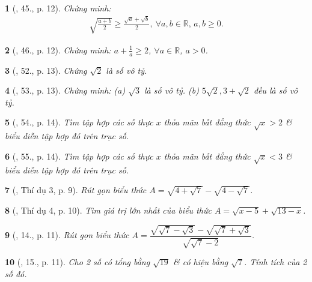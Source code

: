 \documentclass{article}
\newtheorem{baitoan}{}%
\begin{document}
\begin{baitoan}[\cite{SBT_Toan_9_tap_1}, 45., p. 12]
	Chứng minh:
	\begin{align*}
		\sqrt{\frac{a + b}{2}}\ge\frac{\sqrt{a} + \sqrt{b}}{2},\ \forall a,b\in\mathbb{R},\,a,b\ge0.
	\end{align*}
\end{baitoan}

\begin{baitoan}[\cite{SBT_Toan_9_tap_1}, 46., p. 12]
	Chứng minh: $a + \frac{1}{a}\ge2$, $\forall a\in\mathbb{R}$, $a > 0$.
\end{baitoan}

\begin{baitoan}[\cite{SBT_Toan_9_tap_1}, 52., p. 13]
	Chứng $\sqrt{2}$ là số vô tỷ.
\end{baitoan}

\begin{baitoan}[\cite{SBT_Toan_9_tap_1}, 53., p. 13]
	Chứng minh: (a) $\sqrt{3}$ là số vô tỷ. (b) $5\sqrt{2},3 + \sqrt{2}$ đều là số vô tỷ.
\end{baitoan}

\begin{baitoan}[\cite{SBT_Toan_9_tap_1}, 54., p. 14]
	Tìm tập hợp các số thực $x$ thỏa mãn bất đẳng thức $\sqrt{x} > 2$ \& biểu diễn tập hợp đó trên trục số.
\end{baitoan}

\begin{baitoan}[\cite{SBT_Toan_9_tap_1}, 55., p. 14]
	Tìm tập hợp các số thực $x$ thỏa mãn bất đẳng thức $\sqrt{x} < 3$ \& biểu diễn tập hợp đó trên trục số.
\end{baitoan}

\begin{baitoan}[\cite{Tuyen_Toan_9_old}, Thí dụ 3, p. 9]
	Rút gọn biểu thức $A = \sqrt{4 + \sqrt{7}} - \sqrt{4 - \sqrt{7}}$.
\end{baitoan}

\begin{baitoan}[\cite{Tuyen_Toan_9_old}, Thí dụ 4, p. 10]
	Tìm giá trị lớn nhất của biểu thức $A = \sqrt{x - 5} + \sqrt{13 - x}$.
\end{baitoan}

\begin{baitoan}[\cite{Tuyen_Toan_9_old}, 14., p. 11]
	Rút gọn biểu thức $A = \dfrac{\sqrt{\sqrt{7} - \sqrt{3}} - \sqrt{\sqrt{7} + \sqrt{3}}}{\sqrt{\sqrt{7} - 2}}$.
\end{baitoan}

\begin{baitoan}[\cite{Tuyen_Toan_9_old}, 15., p. 11]
	Cho 2 số có tổng bằng $\sqrt{19}$ \& có hiệu bằng $\sqrt{7}$. Tính tích của 2 số đó.
\end{baitoan}
\end{document}
